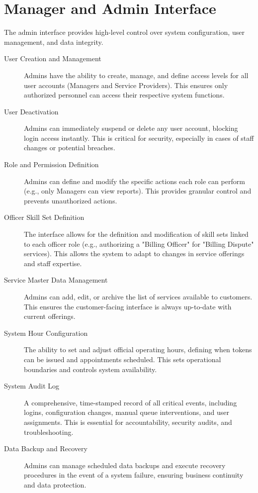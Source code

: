 \documentclass{article}
\begin{document}
\section{Manager and Admin Interface}

The admin interface provides high-level control over system configuration, user management, and data integrity.

\begin{description}
    \item[User Creation and Management] Admins have the ability to create, manage, and define access levels for all user accounts (Managers and Service Providers). This ensures only authorized personnel can access their respective system functions.
    \item[User Deactivation] Admins can immediately suspend or delete any user account, blocking login access instantly. This is critical for security, especially in cases of staff changes or potential breaches.
    \item[Role and Permission Definition] Admins can define and modify the specific actions each role can perform (e.g., only Managers can view reports). This provides granular control and prevents unauthorized actions.
    \item[Officer Skill Set Definition] The interface allows for the definition and modification of skill sets linked to each officer role (e.g., authorizing a "Billing Officer" for "Billing Dispute" services). This allows the system to adapt to changes in service offerings and staff expertise.
    \item[Service Master Data Management] Admins can add, edit, or archive the list of services available to customers. This ensures the customer-facing interface is always up-to-date with current offerings.
    \item[System Hour Configuration] The ability to set and adjust official operating hours, defining when tokens can be issued and appointments scheduled. This sets operational boundaries and controls system availability.
    \item[System Audit Log] A comprehensive, time-stamped record of all critical events, including logins, configuration changes, manual queue interventions, and user assignments. This is essential for accountability, security audits, and troubleshooting.
    \item[Data Backup and Recovery] Admins can manage scheduled data backups and execute recovery procedures in the event of a system failure, ensuring business continuity and data protection.
\end{description}
\end{document}
